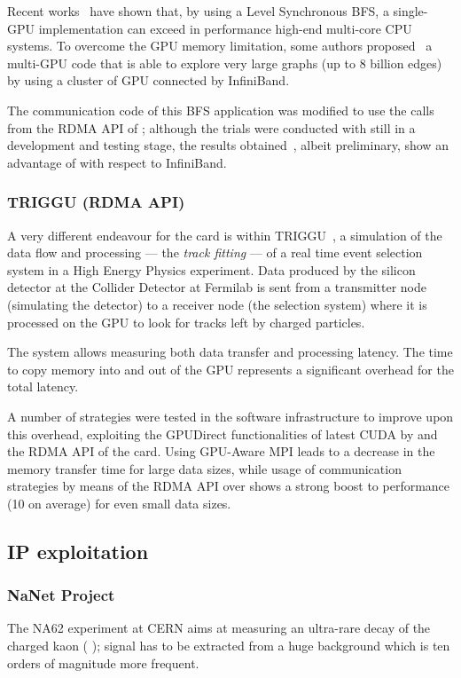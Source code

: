 Recent works~\cite{Hong:2011:BFS} have shown that, by using a Level
Synchronous BFS, a single-GPU implementation can exceed in performance
high-end multi-core CPU systems.
To overcome the GPU memory limitation, some authors
proposed~\cite{Graph400:2012:BFS} a multi-GPU code that is able to
explore very large graphs (up to 8 billion edges) by using a cluster
of GPU connected by InfiniBand.

The communication code of this BFS application was modified to use the
\PtoP calls from the RDMA API of \apenetp; although the trials were
conducted with \apenetp still in a development and testing stage, the
results obtained~\cite{Graph400:2012:IA3,CASS2013}, albeit
preliminary, show an advantage of \apenetp with respect to InfiniBand.

\subsubsection{TRIGGU (RDMA API)}
A very different endeavour for the \apenetp card is within
TRIGGU~\cite{TRIGGU:2012:NSS}, a simulation of the data flow and
processing --- the \emph{track fitting} --- of a real time event
selection system in a High Energy Physics experiment.
Data produced by the silicon detector at the Collider Detector at
Fermilab is sent from a transmitter node (simulating the detector) to
a receiver node (the selection system) where it is processed on the
GPU to look for tracks left by charged particles.

The system allows measuring both data transfer and processing latency.
The time to copy memory into and out of the GPU represents a
significant overhead for the total latency.

A number of strategies were tested in the software infrastructure to
improve upon this overhead, exploiting the GPUDirect functionalities
of latest CUDA by \nvidia and the RDMA API of the \apenetp card.
Using GPU-Aware MPI leads to a decrease in the memory transfer time
for large data sizes, while usage of \PtoP communication strategies by
means of the RDMA API over \apenetp shows a strong boost to
performance (10 \us on average) for even small data sizes.

\subsection{IP exploitation}
\subsubsection{NaNet Project}
The NA62 experiment at CERN aims at measuring an ultra-rare decay of
the charged kaon ( );
signal has to be extracted from a huge background which is ten orders
of magnitude more frequent.

